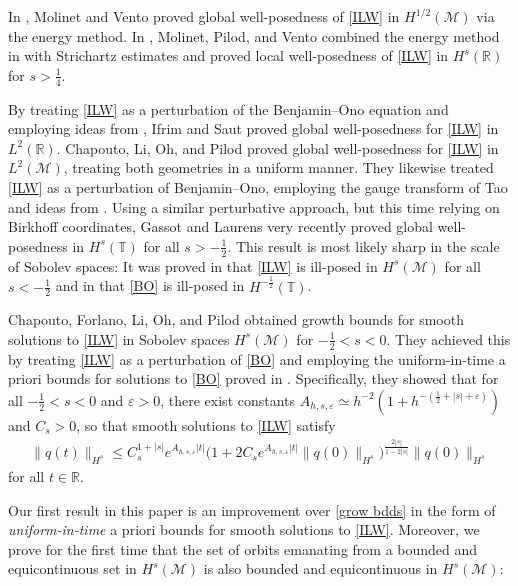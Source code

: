 \documentclass{amsart}
\newcommand{\R}{{\mathbb{R}}}
\newcommand{\T}{{\mathbb{T}}}
\newcommand{\eps}{\varepsilon}
\theoremstyle{definition}
\theoremstyle{remark}
\begin{document}
In \cite{MV}, Molinet and Vento proved global well-posedness of \eqref{ILW} in $H^{1/2}(\mathcal M)$ via the energy method. In \cite{MPV}, Molinet, Pilod, and Vento combined the energy method in \cite{MV} with Strichartz estimates and proved local well-posedness of \eqref{ILW} in $H^s(\R)$ for $s>\frac14$.

By treating \eqref{ILW} as a perturbation of the Benjamin--Ono equation and employing ideas from \cite{IT}, Ifrim and Saut \cite{IS} proved global well-posedness for \eqref{ILW} in $L^2(\mathcal \R)$.  Chapouto, Li, Oh, and Pilod \cite{CLOP} proved global well-posedness for \eqref{ILW} in $L^2(\mathcal M)$, treating both geometries in a uniform manner.  They likewise treated \eqref{ILW} as a perturbation of Benjamin--Ono, employing the  gauge transform of Tao and ideas from \cite{MP}.  Using a similar perturbative approach, but this time relying on Birkhoff coordinates, Gassot and Laurens \cite{GL} very recently proved global well-posedness in \(H^s(\T)\) for all \(s>-\frac12\).  This result is most likely sharp in the scale of Sobolev spaces: It was proved in \cite{CFLOP} that \eqref{ILW} is ill-posed in \(H^s(\mathcal M)\) for all \(s<-\frac12\) and in \cite{MR4652410} that \eqref{BO} is ill-posed in \(H^{-\frac12}(\T)\).

Chapouto, Forlano, Li, Oh, and Pilod \cite{CFLOP} obtained growth bounds for smooth solutions to \eqref{ILW} in Sobolev spaces $H^s(\mathcal M)$ for $-\frac12<s<0$. They achieved this by treating \eqref{ILW} as a perturbation of \eqref{BO} and employing the uniform-in-time a priori bounds for solutions to \eqref{BO} proved in \cite{KLV}. Specifically, they showed that for all $-\frac12<s<0$ and $\eps>0$, there exist constants $A_{h,s,\eps} \simeq h^{-2} (1+h^{-(\frac12+|s|+\eps)})$ and $C_s>0$, so that smooth solutions to \eqref{ILW} satisfy
\begin{align}\label{grow bdds}
\|q(t)\|_{H^s} \leq C_s^{1+|s|} e^{A_{h,s,\eps}|t|} \bigl( 1+2C_se^{A_{h,s,\eps}|t|} \|q(0)\|_{H^s}\bigr)^{\frac{2|s|}{1-2|s|}}\|q(0)\|_{H^s}
\end{align}
for all $t\in \R$.

Our first result in this paper is an improvement over \eqref{grow bdds} in the form of \emph{uniform-in-time} a priori bounds for smooth solutions to \eqref{ILW}.  Moreover, we prove for the first time that the set of orbits emanating from a bounded and equicontinuous set in $H^s(\mathcal M)$ is also bounded and equicontinuous in $H^s(\mathcal M)$:
\end{document}
